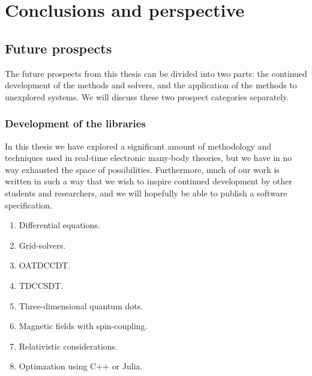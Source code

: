 \chapter{Conclusions and perspective}

    \section{Future prospects}
        The future prospects from this thesis can be divided into two parts: the
        continued development of the methods and solvers, and the application of
        the methods to unexplored systems.
        We will discuss these two prospect categories separately.

        \subsection{Development of the libraries}
            In this thesis we have explored a significant amount of methodology
            and techniques used in real-time electronic many-body theories, but
            we have in no way exhausted the space of possibilities.
            Furthermore, much of our work is written in such a way that we wish
            to inspire continued development by other students and researchers,
            and we will hopefully be able to publish a software specification.

            \begin{enumerate}
                \item Differential equations.
                \item Grid-solvers.
                \item OATDCCDT.
                \item TDCCSDT.
                \item Three-dimensional quantum dots.
                \item Magnetic fields with spin-coupling.
                \item Relativistic considerations.
                \item Optimzation using C++ or Julia.
            \end{enumerate}

